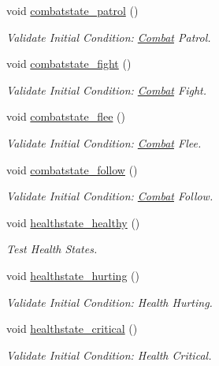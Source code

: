 \begin{DoxyCompactItemize}
void \mbox{\hyperlink{classTestActors_adea89af1b49b9625309097e06bf30cee}{combatstate\+\_\+patrol}} ()
\begin{DoxyCompactList}\small\item\em Validate Initial Condition\+: \mbox{\hyperlink{classCombat}{Combat}} Patrol. \end{DoxyCompactList}\item 
void \mbox{\hyperlink{classTestActors_a86cb8f2392e36427cf5dfd7d6313105b}{combatstate\+\_\+fight}} ()
\begin{DoxyCompactList}\small\item\em Validate Initial Condition\+: \mbox{\hyperlink{classCombat}{Combat}} Fight. \end{DoxyCompactList}\item 
void \mbox{\hyperlink{classTestActors_a029ff6f76874eea67642c655fc106fcc}{combatstate\+\_\+flee}} ()
\begin{DoxyCompactList}\small\item\em Validate Initial Condition\+: \mbox{\hyperlink{classCombat}{Combat}} Flee. \end{DoxyCompactList}\item 
void \mbox{\hyperlink{classTestActors_a0c3caa73a8638b6032ec984b44c739a3}{combatstate\+\_\+follow}} ()
\begin{DoxyCompactList}\small\item\em Validate Initial Condition\+: \mbox{\hyperlink{classCombat}{Combat}} Follow. \end{DoxyCompactList}\item 
void \mbox{\hyperlink{classTestActors_ac3dfeafcbbd46c3ba0f17ec90b0f8260}{healthstate\+\_\+healthy}} ()
\begin{DoxyCompactList}\small\item\em Test Health States. \end{DoxyCompactList}\item 
void \mbox{\hyperlink{classTestActors_ad75102f6eb0169c9decf8d0d77b3177c}{healthstate\+\_\+hurting}} ()
\begin{DoxyCompactList}\small\item\em Validate Initial Condition\+: Health Hurting. \end{DoxyCompactList}\item 
void \mbox{\hyperlink{classTestActors_af669a03e29de04c83ea90877f9f43b7e}{healthstate\+\_\+critical}} ()
\begin{DoxyCompactList}\small\item\em Validate Initial Condition\+: Health Critical. \end{DoxyCompactList}\item 

\end{DoxyCompactItemize}
